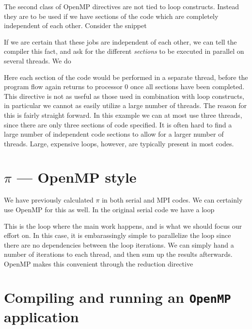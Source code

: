 The second class of OpenMP directives are not tied to loop constructs. Instead
they are to be used if we have sections of the code which are completely
independent of each other. Consider the snippet

If we are certain that these jobs are independent of each other, we can tell the
compiler this fact, and ask for the different \emph{sections} to be executed in
parallel on several threads. We do

Here each section of the code would be performed in a separate thread, before
the program flow again returns to processor 0 once all sections have been
completed. This directive is not as useful as those used in combination with
loop constructs, in particular we cannot as easily utilize a large number of
threads. The reason for this is fairly straight forward. In this example we can
at most use three threads, since there are only three sections of code
specified. It is often hard to find a large number of independent code sections
to allow for a larger number of threads. Large, expensive loops, however, are
typically present in most codes.

\section{$\pi$ --- OpenMP style}
We have previously calculated $\pi$ in both serial and MPI codes. We can
certainly use OpenMP for this as well. In the original serial code we have a
loop

This is the loop where the main work happens, and is what we should focus our
effort on. In this case, it is embarassingly simple to parallelize the loop
since there are no dependencies between the loop iterations. We can simply hand
a number of iterations to each thread, and then sum up the results afterwards.
OpenMP makes this convenient through the reduction directive


\section{Compiling and running an \texttt{OpenMP} application}


